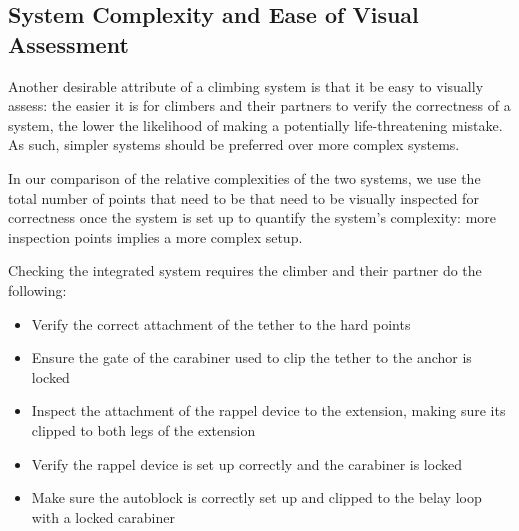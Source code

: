 \documentclass[nonacm,acmtog]{acmart}
\begin{document}
\subsection{System Complexity and Ease of Visual Assessment}
\label{sec:complexity}

   Another desirable attribute of a climbing system is that it  be easy to
   visually assess: the easier it is for climbers and their partners to verify
   the correctness of a system, the lower the likelihood of making a
   potentially life-threatening mistake.  As such, simpler systems should be
   preferred over more complex systems.



   In our comparison of the relative complexities of the two systems, we use
   the total number of points that need to be that need to be visually
   inspected for correctness once the system is set up to quantify the system’s
   complexity: more inspection points implies a more complex setup.

   Checking the integrated system requires the climber and their partner do the
   following:

   \begin{itemize}
      \item Verify the correct attachment of the tether to the hard points

      \item Ensure the gate of the carabiner used to clip the tether to the
      anchor is locked

      \item Inspect the attachment of the rappel device to the extension,
      making sure its clipped to both legs of the extension

      \item Verify the rappel device is set up correctly and the carabiner is
      locked

      \item Make sure the autoblock is correctly set up and clipped to the
      belay loop with a locked carabiner
   \end{itemize}
\end{document}
